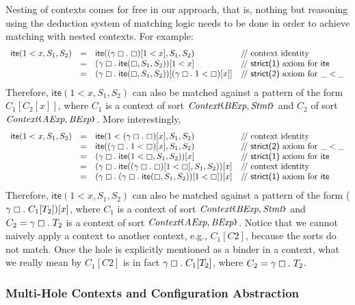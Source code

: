 \documentclass[UTF8,11pt]{article}
\theoremstyle{plain}
\theoremstyle{definition}
\theoremstyle{remark}
\newcommand{\Context}{\textit{Context}}
\newcommand{\hole}{\boxempty}
\newcommand{\AExp}{\textit{AExp}}
\newcommand{\BExp}{\textit{BExp}}
\newcommand{\Stmt}{\textit{Stmt}}
\newcommand{\ite}{\textsf{ite}}
\newcommand{\parametric}[2]{{#1}\raisebox{.2ex}{\texttt{\footnotesize{\{}}}#2\raisebox{.2ex}{\texttt{\footnotesize{\}}}}}
\newcommand{\doubleslash}{/\!/{ }}
\begin{document}
Nesting of contexts comes for free in our approach, that is, nothing but
reasoning using the deduction system of matching logic needs to be done
in order to achieve matching with nested contexts.
For example:
$$
\begin{array}{rcll}
\ite(1 < x,S_1,S_2) & = &
\ite((\gamma\hole.\;\hole)[1 < x],S_1,S_2)
& \textrm{\doubleslash context identity}
\\
& = &
(\gamma\hole.\;\ite(\hole,S_1,S_2))[1 < x]
& \textrm{\doubleslash \textsf{strict(1)} axiom for $\ite$}
\\
& = &
(\gamma\hole.\;\ite(\hole,S_1,S_2))[(\gamma\hole.\;1 < \hole)[x]]
& \textrm{\doubleslash \textsf{strict(2)} axiom for $\_<\_$}
\end{array}
$$
Therefore, $\ite(1 < x,S_1,S_2)$ can also be matched against a pattern
of the form $C_1[C_2[x]]$, where $C_1$ is a context of sort
$\parametric{\Context}{\BExp,\Stmt}$ and $C_2$ of sort
$\parametric{\Context}{\AExp,\BExp}$.
More interestingly,
$$
\begin{array}{rcll}
\ite(1 < x,S_1,S_2) & = &
\ite(1 < (\gamma\hole.\;\hole)[x],S_1,S_2)
& \textrm{\doubleslash context identity}
\\
& = &
\ite((\gamma\hole.\;1 < \hole)[x],S_1,S_2)
& \textrm{\doubleslash \textsf{strict(2)} axiom for $\_<\_$}
\\
& = &
(\gamma\hole.\;\ite(1 < \hole,S_1,S_2))[x]
& \textrm{\doubleslash \textsf{strict(1)} axiom for $\ite$}
\\
& = &
(\gamma\hole.\;\ite((\gamma\hole.\;\hole)[1 < \hole],S_1,S_2))[x]
& \textrm{\doubleslash context identity}
\\
& = &
(\gamma\hole.\;(\gamma\hole.\;\ite(\hole,S_1,S_2))[1 < \hole])[x]
& \textrm{\doubleslash \textsf{strict(1)} axiom for $\ite$}
\end{array}
$$
Therefore, $\ite(1 < x,S_1,S_2)$ can also be matched against a pattern
of the form ($\gamma\hole.\;C_1[T_2])[x]$, where $C_1$ is a context of
sort $\parametric{\Context}{\BExp,\Stmt}$ and $C_2 = \gamma\hole.\;T_2$ is
a context of sort $\parametric{\Context}{\AExp,\BExp}$.
Notice that we cannot naively apply a context to another context, e.g.,
$C_1[C2]$, because the sorts do not match.
Once the hole is explicitly mentioned as a binder in a context, what we really
mean by $C_1[C2]$ is in fact $\gamma\hole.\;C_1[T_2]$, where
$C_2 = \gamma\hole.\;T_2$.


\subsubsection{Multi-Hole Contexts and Configuration Abstraction}
\label{sec:cfg-abstraction}
\end{document}
